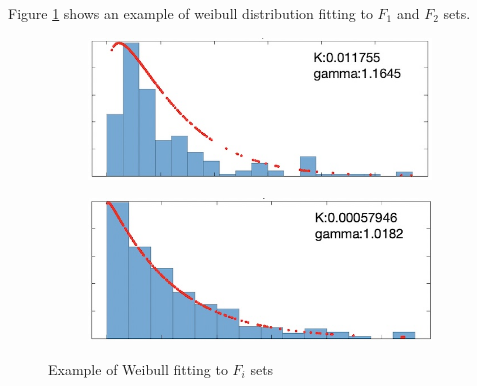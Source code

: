 \documentclass[conference]{IEEEtran}
\begin{document}
Figure \ref{fig:weibull_fit} shows an example of weibull distribution fitting to $F_1$ and $F_2$ sets.
\begin{figure}[tbh]
    \centering
    \begin{subfigure}{0.24\textwidth}
        \centering
        \includegraphics[width=\linewidth]{weibull1.jpg}
       \caption{}
    \end{subfigure}
    \hfill
    \begin{subfigure}{0.24\textwidth}
        \centering
        \includegraphics[width=\linewidth]{weibull2.jpg}
        \caption{}
    \end{subfigure}
    \caption{Example of Weibull fitting to $F_i$ sets}
    \label{fig:weibull_fit}
\end{figure}



%
%
\end{document}
